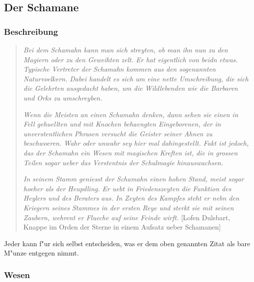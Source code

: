 \subsection{Der Schamane}
\subsubsection{Beschreibung}
\begin{quotation}
\par\textit{\glqq Bei dem Schamahn kann man sich streyten, ob man ihn nun zu den Magiern oder zu den Geweihten zelt. Er hat eigentlich von beidn etwas.}
\textit{Typische Vertreter der Schamahn kommen aus den sogenannten
Naturvoelkern. Dabei handelt es sich um eine nette Umschreibung, die sich
die Gelehrten ausgedacht haben, um die Wildlebenden wie die Barbaren
und Orks zu umschreyben.}
\par\textit{Wenn die Meisten an einen Schamahn denken, dann sehen
sie einen in Fell gehuellten und mit Knochen behaengten
Eingeborenen, der in unverstentlichen Phrasen versucht die Geister
seiner Ahnen zu beschwoeren. Wahr oder unwahr sey hier mal
dahingestellt. Fakt ist jedoch, das der Schamahn ein Wesen mit
magischen Kreften ist, die in grossen Teilen sogar ueber das
Verstentnis der Schulmagie hinauswachsen.}
\par\textit{In seinem Stamm geniesst der Schamahn einen hohen Stand,
meist sogar hoeher als der Heupdling. Er uebt in Friedenszeyten die
Funktion des Heylers und des Beraters aus. In Zeyten des Kampfes
steht er nebn den Kriegern seines Stammes in der ersten Reye und
sterkt sie mit seinen Zaubern, wehrent er Flueche auf seine Feinde
wirft.\grqq} [\mbox{Lofen} \mbox{Dulsbart}, Knappe im Orden der
Sterne in einem Aufsatz ueber Schamanen]
\end{quotation}
\par Jeder kann f"ur sich selbst entscheiden, was er dem oben genannten Zitat als bare M"unze entgegen nimmt.
\subsubsection{Wesen}
